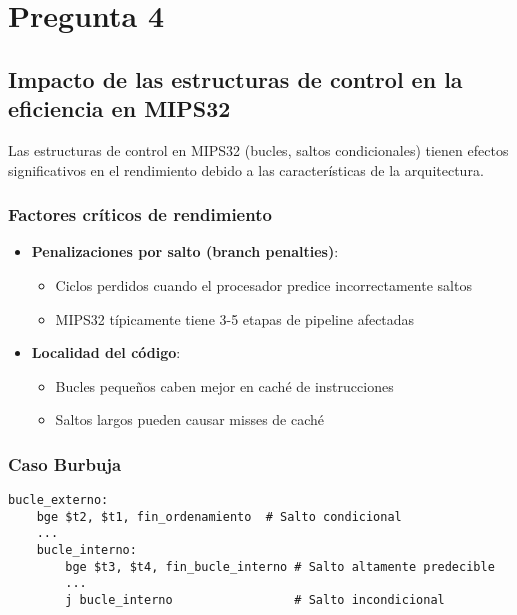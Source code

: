 \documentclass{article}
\begin{document}
\section*{Pregunta 4}

\subsection*{Impacto de las estructuras de control en la eficiencia en MIPS32}

Las estructuras de control en MIPS32 (bucles, saltos condicionales) tienen efectos significativos en el rendimiento debido a las características de la arquitectura.

\subsubsection*{Factores críticos de rendimiento}

\begin{itemize}
    \item \textbf{Penalizaciones por salto (branch penalties)}:
    \begin{itemize}
        \item Ciclos perdidos cuando el procesador predice incorrectamente saltos
        \item MIPS32 típicamente tiene 3-5 etapas de pipeline afectadas
    \end{itemize}
    
    \item \textbf{Localidad del código}:
    \begin{itemize}
        \item Bucles pequeños caben mejor en caché de instrucciones
        \item Saltos largos pueden causar misses de caché
    \end{itemize}
\end{itemize}

\subsubsection*{Caso Burbuja}

\begin{verbatim}
bucle_externo:
    bge $t2, $t1, fin_ordenamiento  # Salto condicional
    ...
    bucle_interno:
        bge $t3, $t4, fin_bucle_interno # Salto altamente predecible
        ...
        j bucle_interno                 # Salto incondicional
\end{verbatim}
\end{document}
